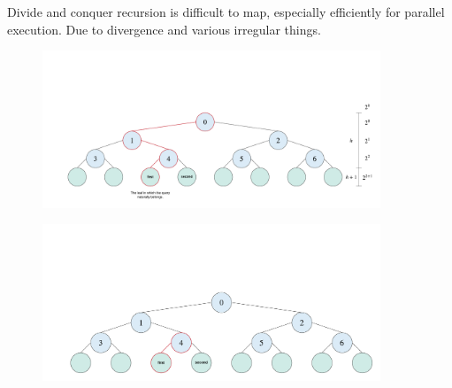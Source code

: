 Divide and conquer recursion is difficult to map, especially efficiently for parallel execution. Due to divergence and various irregular things.  










\begin{figure}[H]
\centering
\includegraphics[width=0.9\textwidth]{pics/kd-tree-visual/22.png}
\caption{}
\end{figure}

\begin{figure}[H]
\centering
\includegraphics[width=0.9\textwidth]{pics/kd-tree-visual/3.png}
\caption{}
\end{figure}

